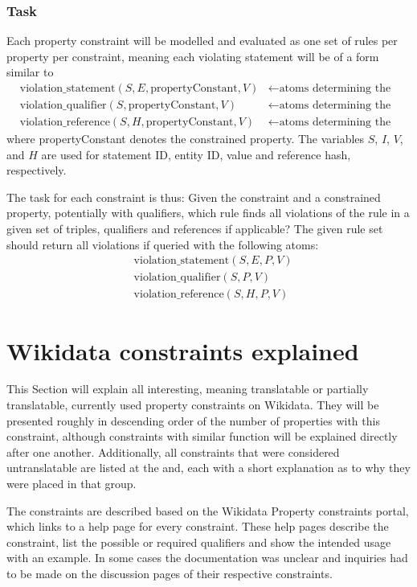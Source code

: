 \documentclass[hyperref,bachelorofscience,fleqn]{cgvpub}
\begin{document}
\subsection{Task}\label{subsec_task}
Each property constraint will be modelled and evaluated as one set of rules per property per constraint, meaning each violating statement will be of a form similar to
\begin{align*}
&\text{violation\_statement}(S, E, \text{propertyConstant}, V) &\leftarrow \text{atoms determining the violation} \\
&\text{violation\_qualifier}(S, \text{propertyConstant}, V) &\leftarrow \text{atoms determining the violation} \\
&\text{violation\_reference}(S, H, \text{propertyConstant}, V) &\leftarrow \text{atoms determining the violation}
\end{align*}
where propertyConstant denotes the constrained property. The variables \(S\), \(I\), \(V\), and \(H\) are used for statement ID, entity ID, value and reference hash, respectively.

The task for each constraint is thus: Given the constraint and a constrained property, potentially with qualifiers, which rule finds all violations of the rule in a given set of triples, qualifiers and references if applicable? The given rule set should return all violations if queried with the following atoms:
\begin{align*}
&\text{violation\_statement}(S, E, P, V) \\
&\text{violation\_qualifier}(S, P, V) \\
&\text{violation\_reference}(S, H, P, V)
\end{align*}

\chapter{Wikidata constraints explained}\label{cha_wikidata_constraints_explained}
This Section will explain all interesting, meaning translatable or partially translatable, currently used property constraints on Wikidata. They will be presented roughly in descending order of the number of properties with this constraint, although constraints with similar function will be explained directly after one another. Additionally, all constraints that were considered untranslatable are listed at the and, each with a short explanation as to why they were placed in that group.

The constraints are described based on the Wikidata Property constraints portal\cite{constraintsPortal}, which links to a help page for every constraint. These help pages describe the constraint, list the possible or required qualifiers and show the intended usage with an example. In some cases the documentation was unclear and inquiries had to be made on the discussion pages of their respective constraints.
\end{document}
